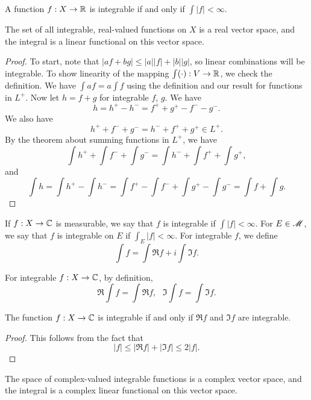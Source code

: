 \documentclass[12pt]{article} %
\begin{document}
\begin{proposition}
    A function $f : X \to \mathbb{R}$ is integrable if and only if $\int |f| < \infty$.
\end{proposition}

\begin{proposition}
    The set of all integrable, real-valued functions on $X$ is a real vector space, and the integral is a linear functional on this vector space.
\end{proposition}

\begin{proof}
    To start, note that $|af + bg| \leq |a||f| + |b||g|$, so linear combinations will be integrable. To show linearity of the mapping $\int (\cdot) : V \to \mathbb{R}$, we check the definition. We have $\int a f = a \int f$ using the definition and our result for functions in $L^+$. Now let $h = f + g$ for integrable $f$, $g$. We have \[h = h^+ - h^- = f^+ + g^+ - f^- - g^-.\] We also have \[h^+ + f^- + g^- = h^- + f^+ + g^+ \in L^+.\] By the theorem about summing functions in $L^+$, we have \[\int h^+ + \int f^- + \int g^- = \int h^- + \int f^+ + \int g^+,\] and \[\int h = \int h^+ - \int h^- = \int f^+ - \int f^-  +\int g^+ - \int g^- = \int f + \int g.\]
\end{proof}

\begin{definition}
    If $f : X \to \mathbb{C}$ is measurable, we say that $f$ is integrable if $\int |f| < \infty$. For $E \in \mathscr{M}$, we say that $f$ is integrable on $E$ if $\int_E |f| < \infty$. For integrable $f$, we define \[\int f = \int \Re f + i \int \Im f.\]
\end{definition}

\begin{remark}
    For integrable $f : X \to \mathbb{C}$, by definition, \[\Re \int f = \int \Re f, \ \ \ \Im \int f = \int \Im f.\]
\end{remark}

\begin{proposition}
    The function $f: X \to \mathbb{C}$ is integrable if and only if $\Re f$ and $\Im f$ are integrable.
\end{proposition}

\begin{proof}
    This follows from the fact that \[|f| \leq |\Re f| + |\Im f| \leq 2|f|.\]
\end{proof}

\begin{proposition}
    The space of complex-valued integrable functions is a complex vector space, and the integral is a complex linear functional on this vector space.
\end{proposition}
\end{document}
